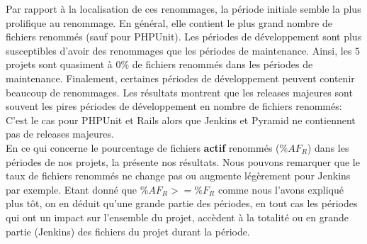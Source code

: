 Par rapport à la localisation de ces renommages, la période initiale semble la plus prolifique au renommage. En général, elle contient le plus grand nombre de fichiers renommés (sauf pour PHPUnit). Les périodes de développement sont plus susceptibles d'avoir des renommages que les périodes de maintenance. Ainsi, les $5$ projets sont quasiment à $0\%$ de fichiers renommés dans les périodes de maintenance. Finalement, certaines périodes de développement peuvent contenir beaucoup de renommages. Les résultats montrent que les releases majeures sont souvent les pires périodes de développement en nombre de fichiers renommés: C'est le cas pour PHPUnit et Rails alors que Jenkins et Pyramid ne contiennent pas de releases majeures.\\



En ce qui concerne le pourcentage de fichiers \textbf{actif} renommés ($\%AF_R$) dans les périodes de nos projets, la  présente nos résultats. Nous pouvons remarquer que le taux de fichiers renommés ne change pas ou augmente légèrement pour Jenkins par exemple. Etant donné que $\%AF_R >= \%F_R$ comme nous l'avons expliqué plus tôt, on en déduit qu'une grande partie des périodes, en tout cas les périodes qui ont un impact sur l'ensemble du projet, accèdent à la totalité ou en grande partie (Jenkins) des fichiers du projet durant la période. \\

